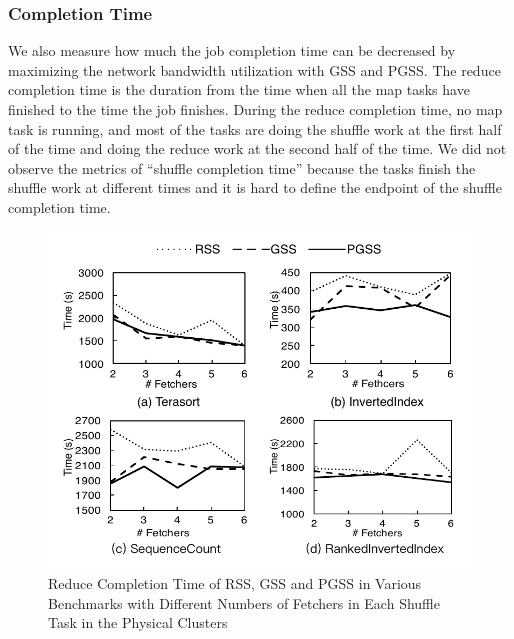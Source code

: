 \documentclass[10pt,journal,compsoc]{IEEEtran}
\begin{document}
\subsubsection{Completion Time}
We also measure how much the job completion time can be decreased by maximizing the network bandwidth utilization with GSS and PGSS. 
The reduce completion time is the duration from the time when all the
map tasks have finished to the time the job finishes.
During the reduce completion time, no map task is running, and most of
the tasks are doing the shuffle work at the first half of the time and
doing the reduce work at the second half of the time.
We did not observe the metrics of ``shuffle completion time'' because
the tasks finish the shuffle work at different times and it is hard to
define the endpoint of the shuffle completion time.


\begin{figure}
\centering
\includegraphics[width=1\columnwidth]{figure7}
\caption{Reduce Completion Time of RSS, GSS and PGSS in Various Benchmarks with Different Numbers of Fetchers in Each Shuffle Task
in the Physical Clusters} 
\label{fig:new_reduce_completion}
\end{figure}

\end{document}

